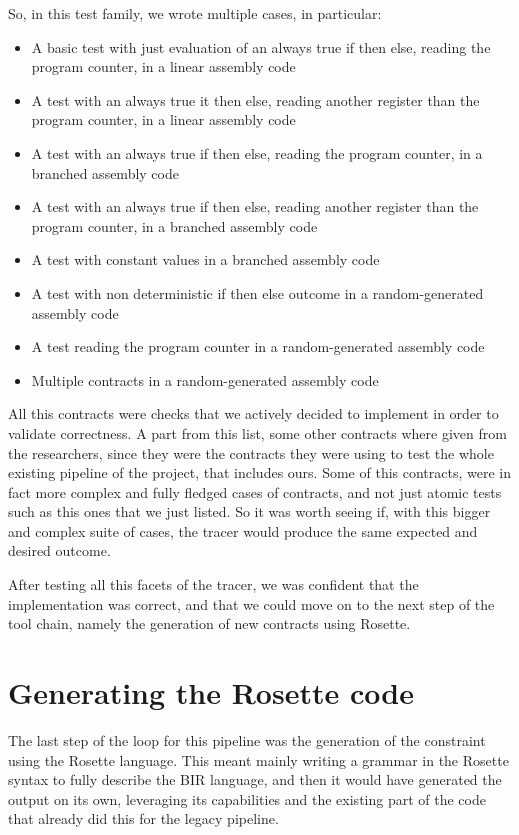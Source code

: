 So, in this test family, we wrote multiple cases, in particular:
\begin{itemize}
  \item A basic test with just evaluation of an always true if then else,
    reading the program counter, in a linear assembly code

  \item A test with an always true it then else, reading another register than
    the program counter, in a linear assembly code

  \item A test with an always true if then else, reading the program counter, in
    a branched assembly code

  \item A test with an always true if then else, reading another register than
    the program counter, in a branched assembly code

  \item A test with constant values in a branched assembly code

  \item A test with non deterministic if then else outcome in a random-generated
    assembly code

  \item A test reading the program counter in a random-generated assembly code

  \item Multiple contracts in a random-generated assembly code
\end{itemize}

All this contracts were checks that we actively decided to implement in order to
validate correctness. A part from this list, some other contracts where given from
the researchers, since they were the contracts they were using to test the whole
existing pipeline of the project, that includes ours. Some of this contracts, were
in fact more complex and fully fledged cases of contracts, and not just atomic
tests such as this ones that we just listed. So it was worth seeing if, with
this bigger and complex suite of cases, the tracer would produce the same expected
and desired outcome.

After testing all this facets of the tracer, we was confident that the
implementation was correct, and that we could move on to the next step of the tool
chain, namely the generation of new contracts using Rosette.

\section{Generating the Rosette code}
\label{cha:Generating the Rosette code} The last step of the loop for this
pipeline was the generation of the constraint using the Rosette language. This meant
mainly writing a grammar in the Rosette syntax to fully describe the BIR language,
and then it would have generated the output on its own, leveraging its capabilities
and the existing part of the code that already did this for the legacy pipeline.

